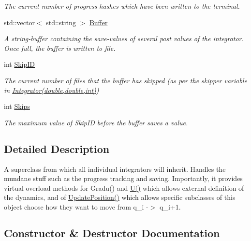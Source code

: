 \begin{DoxyCompactItemize}
\begin{DoxyCompactList}\small\item\em The current number of progress hashes which have been written to the terminal. \end{DoxyCompactList}\item 
std\+::vector$<$ std\+::string $>$ \hyperlink{classQDynamics_1_1Integrator_af8889c2bbe10237a8dd8c46b25b15d29}{Buffer}
\begin{DoxyCompactList}\small\item\em A string-\/buffer containing the save-\/values of several past values of the integrator. Once full, the buffer is written to file. \end{DoxyCompactList}\item 
int \hyperlink{classQDynamics_1_1Integrator_a95e110d6b14003db39f8a52180b97870}{Skip\+ID}
\begin{DoxyCompactList}\small\item\em The current number of files that the buffer has skipped (as per the skipper variable in \hyperlink{classQDynamics_1_1Integrator_aa469124cb408fadbaa540555dfabee33}{Integrator(double,double,int)}) \end{DoxyCompactList}\item 
int \hyperlink{classQDynamics_1_1Integrator_a409e18faeeefa5fb63f7bcce3eb0e381}{Skips}
\begin{DoxyCompactList}\small\item\em The maximum value of Skip\+ID before the buffer saves a value. \end{DoxyCompactList}\end{DoxyCompactItemize}


\subsection{Detailed Description}
A superclass from which all individual integrators will inherit. Handles the mundane stuff such as the progress tracking and saving. Importantly, it provides virtual overload methods for Gradu() and \hyperlink{classQDynamics_1_1Integrator_afa838ba8dfb0fbde1f77c6d2a45a9dd0}{U()} which allows external definition of the dynamics, and of \hyperlink{classQDynamics_1_1Integrator_a4effa27d56f3205e53653b1fdc5cd08e}{Update\+Position()} which allows specific subclasses of this object choose how they want to move from q\+\_\+i -\/$>$ q\+\_\+i+1. 

\subsection{Constructor \& Destructor Documentation}
\mbox{\label{classQDynamics_1_1Integrator_a677dd555cee316d6d456b7da258c4385}} 
